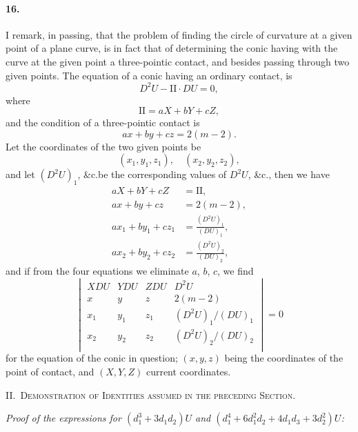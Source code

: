 \documentclass[11pt,a4paper]{book}
\begin{document}
\paragraph{16.}
I  remark,  in  passing,  that  the  problem  of  finding  the  circle  of  curvature  at
a  given  point  of  a  plane  curve,  is  in  fact  that  of  determining  the  conic  having  with
the  curve  at  the  given  point  a  three-pointic  contact,  and  besides  passing  through  two
given  points.     The  equation  of  a  conic  having  an  ordinary  contact,  is
\[
D^2 U - \mathrm{II} \cdot DU = 0,
\]
where
\[
\mathrm{II} = aX + bY + cZ,
\]
and  the  condition  of  a  three-pointic  contact  is
\[
ax + by + cz = 2(m-2).
\]
Let  the  coordinates  of  the  two  given  points  be
\[
(x_1, y_1, z_1), \quad (x_2, y_2, z_2),
\]
and  let  $(D^2 U)_1$,  \&c.\@  be  the  corresponding  values  of  $D^2 U$,  \&c.,  then  we  have
\begin{align*}
aX + bY + cZ &= \mathrm{II}, \\
ax + by + cz &= 2(m-2), \\
ax_1 + by_1 + cz_1 &= \frac{(D^2 U)_1}{(DU)_1}, \\
ax_2 + by_2 + cz_2 &= \frac{(D^2 U)_2}{(DU)_2},
\end{align*}
and  if  from  the  four  equations  we  eliminate  $a$,  $b$,  $c$,  we  find
\[
\begin{vmatrix}
XDU & YDU & ZDU & D^2 U \\
x & y & z & 2(m-2) \\
x_1 & y_1 & z_1 & (D^2 U)_1/(DU)_1 \\
x_2 & y_2 & z_2 & (D^2 U)_2/(DU)_2 \\
\end{vmatrix} = 0
\]
for  the   equation   of   the  conic  in   question;   $(x, y, z)$   being   the   coordinates   of  the   point
of  contact,  and  $(X, Y, Z)$  current  coordinates.

\newpage
\noindent\textsc{II.~Demonstration of Identities assumed in the preceding Section.}

\medskip

\noindent\textit{Proof of the expressions for $(d_1^3 + 3d_1 d_2)U$ and $(d_1^4 + 6d_1^2 d_2 + 4d_1 d_3 + 3d_2^2)U$:}
\end{document}
